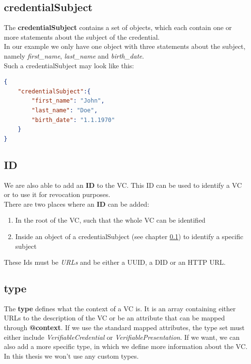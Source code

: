 \documentclass[
	a4paper               %
	,BCOR=0mm            %
	,bibliography=totoc   %
	,listof=totoc         %
	,monolingual
	,twoside=false
]{bfhthesis}              %
\begin{document}
\subsection{credentialSubject}
\label{subsub:credentialsubject}
The \textbf{credentialSubject} contains a set of objects, which each contain one or more statements about the subject of the credential.\\
In our example we only have one object with three statements about the subject, namely \textit{first\_name}, \textit{last\_name} and \textit{birth\_date}.\\
Such a credentialSubject may look like this:\newpage
\begin{lstlisting}[language=json,firstnumber=1,caption={Example credentialSubject},captionpos=b]
{
	"credentialSubject":{
		"first_name": "John",
		"last_name": "Doe",
		"birth_date": "1.1.1970"
	}
}
\end{lstlisting}

\subsection{ID}
We are also able to add an \textbf{ID} to the VC. This ID can be used to identify a VC or to use it for revocation purposes.\\
There are two places where an \textbf{ID} can be added:
\begin{enumerate}
	\item In the root of the VC, such that the whole VC can be identified
	\item Inside an object of a credentialSubject (see chapter \ref{subsub:credentialsubject}) to identify a specific subject
\end{enumerate}

These Ids must be \textit{URLs} and be either a UUID, a DID or an HTTP URL.

\subsection{type}

The \textbf{type} defines what the context of a VC is. 
It is an array containing either URLs to the description of the VC or be an attribute that can be mapped through \textbf{@context}.
If we use the standard mapped attributes, the type set must either include \textit{VerifiableCredential} or \textit{VerifiablePresentation}.
If we want, we can also add a more specific type, in which we define more information about the VC.\\
In this thesis we won't use any custom types.
\end{document}
